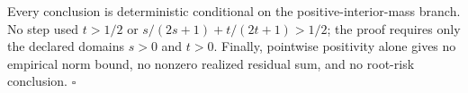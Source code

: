Every conclusion is deterministic conditional on the positive-interior-mass branch.  No step used \(t>1/2\) or \(s/(2s+1)+t/(2t+1)>1/2\); the proof requires only the declared domains \(s>0\) and \(t>0\).  Finally, pointwise positivity alone gives no empirical norm bound, no nonzero realized residual sum, and no root-risk conclusion. \(\square\)